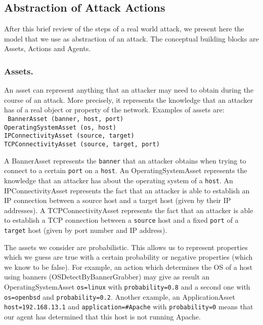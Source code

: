\documentclass{llncs}
\begin{document}
\subsection{Abstraction of Attack Actions}

After this brief review of the steps of a real world attack, we present here the model 
that we use as abstraction of an attack.
The conceptual building blocks are Assets, Actions and Agents.


\subsubsection{Assets.}

An asset can represent anything that an attacker may need to
obtain during the course of an attack. More precisely, it 
represents the knowledge that an attacker has of a real object 
or property of the network. Examples of assets are: \\
{\tt 
\indent * BannerAsset (banner, host, port) \\
\indent * OperatingSystemAsset (os, host) \\
\indent * IPConnectivityAsset (source, target) \\
\indent * TCPConnectivityAsset (source, target, port) }

\noindent
A BannerAsset represents the {\tt banner} that an attacker
obtains when trying to connect to a certain {\tt port} on a {\tt host}. 
An OperatingSystemAsset represents the knowledge that an attacker
has about the operating system of a {\tt host}.
An IPConnectivityAsset represents the fact that an attacker is able to establish
an IP connection between a source host and a target host (given by their IP addresses).
A TCPConnectivityAsset represents the fact that an attacker is able
to establish a TCP connection between a {\tt source} host and a fixed
{\tt port} of a {\tt target} host (given by port number and IP address).

The assets we consider are probabilistic. This allows us to represent
properties which we guess are true with a certain probability
or negative properties (which we know to be false). For example,
an action which determines the OS of a host using banners 
(OSDetectByBannerGrabber) may give as result an 
OperatingSystemAsset {\tt os=linux} with {\tt probability=0.8} and
a second one with {\tt os=openbsd} and {\tt probability=0.2}. 
Another example, an ApplicationAsset {\tt host=192.168.13.1}
and {\tt application=\#Apache} with {\tt probability=0} means that 
our agent has determined that this host is not running Apache.
\end{document}
